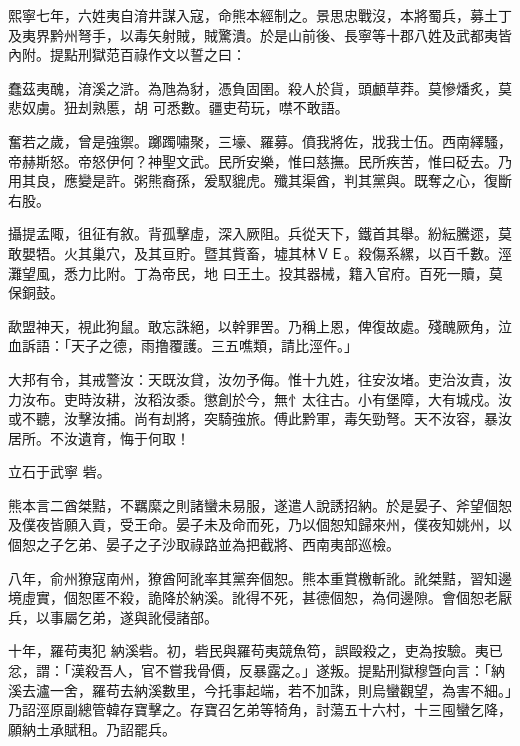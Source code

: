 \begin{pinyinscope}
 熙寧七年，六姓夷自淯井謀入寇，命熊本經制之。景思忠戰沒，本將蜀兵，募土丁及夷界黔州弩手，以毒矢射賊，賊驚潰。於是山前後、長寧等十郡八姓及武都夷皆內附。提點刑獄范百祿作文以誓之曰：



 蠢茲夷醜，淯溪之滸。為虺為豺，憑負固圉。殺人於貨，頭顱草莽。莫慘燔炙，莫悲奴虜。狃刦熟慝，胡
 可悉數。疆吏苟玩，噤不敢語。



 奮若之歲，曾是強禦。躑躅嘯聚，三壕、羅募。僨我將佐，戕我士伍。西南繹騷，帝赫斯怒。帝怒伊何？神聖文武。民所安樂，惟曰慈撫。民所疾苦，惟曰砭去。乃用其良，應變是許。粥熊裔孫，爰馭貔虎。殲其渠酋，判其黨與。既奪之心，復斷右股。



 攝提孟陬，徂征有敘。背孤擊虛，深入厥阻。兵從天下，鐵首其舉。紛紜騰遝，莫敢嬰牾。火其巢穴，及其亘貯。暨其貲畜，墟其林ＶＥ。殺傷系縲，以百千數。涇灘望風，悉力比附。丁為帝民，地
 曰王土。投其器械，籍入官府。百死一贖，莫保銅鼓。



 歃盟神天，視此狗鼠。敢忘誅絕，以幹罪罟。乃稱上恩，俾復故處。殘醜厥角，泣血訴語：「天子之德，雨撸覆護。三五噍類，請比涇仵。」



 大邦有令，其戒警汝：天既汝貸，汝勿予侮。惟十九姓，往安汝堵。吏治汝責，汝力汝布。吏時汝耕，汝稻汝黍。懲創於今，無忄太往古。小有堡障，大有城戍。汝或不聽，汝擊汝捕。尚有刦將，突騎強旅。傅此黔軍，毒矢勁弩。天不汝容，暴汝居所。不汝遺育，悔于何取！



 立石于武寧
 砦。



 熊本言二酋桀黠，不羈縻之則諸蠻未易服，遂遣人說誘招納。於是晏子、斧望個恕及僕夜皆願入貢，受王命。晏子未及命而死，乃以個恕知歸來州，僕夜知姚州，以個恕之子乞弟、晏子之子沙取祿路並為把截將、西南夷部巡檢。



 八年，俞州獠寇南州，獠酋阿訛率其黨奔個恕。熊本重賞檄斬訛。訛桀黠，習知邊境虛實，個恕匿不殺，詭降於納溪。訛得不死，甚德個恕，為伺邊隙。會個恕老厭兵，以事屬乞弟，遂與訛侵諸部。



 十年，羅苟夷犯
 納溪砦。初，砦民與羅苟夷競魚笱，誤毆殺之，吏為按驗。夷已忿，謂：「漢殺吾人，官不嘗我骨價，反暴露之。」遂叛。提點刑獄穆曁向言：「納溪去瀘一舍，羅苟去納溪數里，今托事起端，若不加誅，則烏蠻觀望，為害不細。」乃詔涇原副總管韓存寶擊之。存寶召乞弟等犄角，討蕩五十六村，十三囤蠻乞降，願納土承賦租。乃詔罷兵。




\end{pinyinscope}
